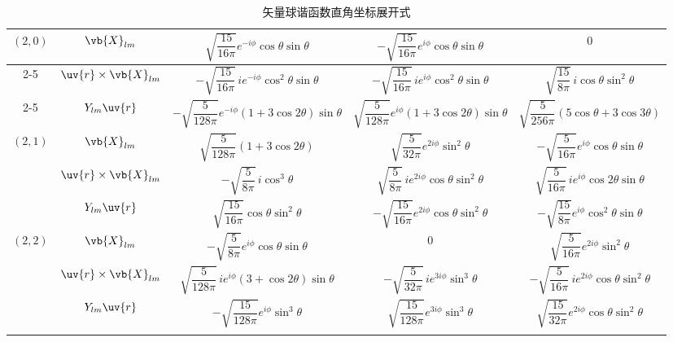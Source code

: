 \begin{longtable}{ccccc}
	\midrule
	\multirow{3}{*}{\((2,0)\)}
	          & \(\vb{X}_{lm}\)             & \(\sqrt{\dfrac{15}{16\pi}} e^{-i\phi} \cos\theta \sin\theta\)                    & \(-\sqrt{\dfrac{15}{16\pi}} e^{i\phi} \cos\theta \sin\theta\)                & \(0\)                                                                \\
	\cmidrule(lr){2-5}
	          & \(\uv{r}\times\vb{X}_{lm}\) & \(-\sqrt{\dfrac{15}{16\pi}} \, i e^{-i\phi} \cos^2\theta\sin\theta\)             & \(-\sqrt{\dfrac{15}{16\pi}} \, i e^{i\phi} \cos^2\theta\sin\theta\)          & \(\sqrt{\dfrac{15}{8\pi}} \, i \cos\theta\sin^2\theta\)              \\
	\cmidrule(lr){2-5}
	          & \(Y_{lm}\uv{r}\)            & \(-\sqrt{\dfrac{5}{128\pi}} e^{-i\phi} \left(1+3\cos2\theta\right)\sin\theta\)   & \(\sqrt{\dfrac{5}{128\pi}} e^{i\phi} \left(1+3\cos2\theta\right)\sin\theta\) & \(\sqrt{\dfrac{5}{256\pi}} \left(5\cos\theta+3\cos3\theta\right)\)   \\
	\midrule
	\multirow{3}{*}{\((2,1)\)}
	          & \(\vb{X}_{lm}\)             & \(\sqrt{\dfrac{5}{128\pi}} \left(1+3\cos2\theta\right)\)                         & \(\sqrt{\dfrac{5}{32\pi}} e^{2i\phi} \sin^2\theta\)                          & \(-\sqrt{\dfrac{5}{16\pi}} e^{i\phi} \cos\theta \sin\theta\)         \\
	\cmidrule(lr){2-5}
	          & \(\uv{r}\times\vb{X}_{lm}\) & \(-\sqrt{\dfrac{5}{8\pi}} \, i \cos^3\theta\)                                    & \(\sqrt{\dfrac{5}{8\pi}} \, i e^{2i\phi} \cos\theta\sin^2\theta\)            & \(\sqrt{\dfrac{5}{16\pi}} \, i e^{i\phi} \cos2\theta\sin\theta\)     \\
	\cmidrule(lr){2-5}
	          & \(Y_{lm}\uv{r}\)            & \(\sqrt{\dfrac{15}{16\pi}} \cos\theta\sin^2\theta\)                              & \(-\sqrt{\dfrac{15}{16\pi}} e^{2i\phi} \cos\theta\sin^2\theta\)              & \(-\sqrt{\dfrac{15}{8\pi}} e^{i\phi} \cos^2\theta\sin\theta\)        \\
	\midrule
	\multirow{3}{*}{\((2,2)\)}
	          & \(\vb{X}_{lm}\)             & \(-\sqrt{\dfrac{5}{8\pi}} e^{i\phi} \cos\theta \sin\theta\)                      & \(0\)                                                                        & \(\sqrt{\dfrac{5}{16\pi}} e^{2i\phi} \sin^2\theta\)                  \\
	\cmidrule(lr){2-5}
	          & \(\uv{r}\times\vb{X}_{lm}\) & \(\sqrt{\dfrac{5}{128\pi}} \, i e^{i\phi} \left(3+\cos2\theta\right)\sin\theta\) & \(-\sqrt{\dfrac{5}{32\pi}} \, i e^{3i\phi} \sin^3\theta\)                    & \(-\sqrt{\dfrac{5}{16\pi}} \, i e^{2i\phi} \cos\theta\sin^2\theta\)  \\
	\cmidrule(lr){2-5}
	          & \(Y_{lm}\uv{r}\)            & \(-\sqrt{\dfrac{15}{128\pi}} e^{i\phi} \sin^3\theta\)                            & \(\sqrt{\dfrac{15}{128\pi}} e^{3i\phi} \sin^3\theta\)                        & \(\sqrt{\dfrac{15}{32\pi}} e^{2i\phi} \cos\theta\sin^2\theta\)       \\
	\bottomrule[1pt]
	\caption{矢量球谐函数直角坐标展开式}
	\label{矢量球谐函数直角坐标展开式}
\end{longtable}

